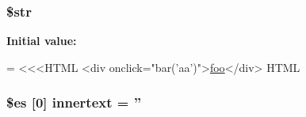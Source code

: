 \hypertarget{reader_2element__testcase_8php_a7542d95618011800c61773127fa625cf}{
\subsubsection[{\$str}]{\setlength{\rightskip}{0pt plus 5cm}\$str}}\label{reader_2element__testcase_8php_a7542d95618011800c61773127fa625cf}
{\bfseries Initial value\+:}
\begin{DoxyCode}
= <<<HTML
<div onclick=\textcolor{stringliteral}{"bar('aa')"}>\hyperlink{strip__testcase_8php_aa901575d6c772d2340f7e16cf7028985}{foo}</div>
HTML
\end{DoxyCode}
\hypertarget{reader_2element__testcase_8php_ad9729d59b61f6fd5102cd7af27b641e6}{
\subsubsection[{innertext}]{\setlength{\rightskip}{0pt plus 5cm}\$es \mbox{[}0\mbox{]} innertext = ''}}\label{reader_2element__testcase_8php_ad9729d59b61f6fd5102cd7af27b641e6}
